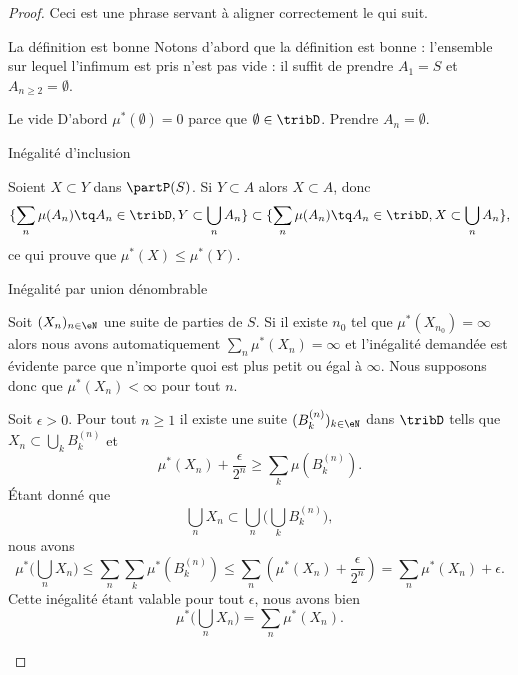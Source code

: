 \begin{proof}
    Ceci est une phrase servant à aligner correctement le  qui suit.
    \begin{subproof}
    \item[La définition est bonne]
    Notons d'abord que la définition est bonne : l'ensemble sur lequel l'infimum est pris n'est pas vide : il suffit de prendre \( A_1=S\) et \( A_{n\geq 2}=\emptyset\).
    \item[Le vide]
        D'abord \( \mu^*(\emptyset)=0\) parce que \( \emptyset\in\tribD\). Prendre \( A_n=\emptyset\).
    \item[Inégalité d'inclusion]

        Soient \( X\subset Y\) dans \( \partP(S)\). Si \( Y\subset A\) alors \( X\subset A\), donc
        \begin{equation}
            \{ \sum_n\mu(A_n)\tq A_n\in\tribD,Y\subset\bigcup_nA_n \} \subset\{ \sum_n\mu(A_n)\tq A_n\in\tribD,X\subset\bigcup_nA_n \} ,
        \end{equation}
        ce qui prouve que \( \mu^*(X)\leq \mu^*(Y)\).
    \item[Inégalité par union dénombrable]

        Soit \( (X_n)_{n\in \eN}\) une suite de parties de \( S\). Si il existe \( n_0\) tel que \( \mu^*(X_{n_0})=\infty\) alors nous avons automatiquement \( \sum_n\mu^*(X_n)=\infty\) et l'inégalité demandée est évidente parce que n'importe quoi est plus petit ou égal à \( \infty\). Nous supposons donc que \( \mu^*(X_n)<\infty\) pour tout \( n\). 

        Soit \( \epsilon>0\). Pour tout \( n\geq 1\) il existe une suite \( (B_k^{(n)})_{k\in \eN}\) dans \( \tribD\) tells que \( X_n\subset\bigcup_kB_k^{(n)}\) et
        \begin{equation}
            \mu^*(X_n)+\frac{ \epsilon }{ 2^n }\geq \sum_k\mu(B_k^{(n)}).
        \end{equation}
        Étant donné que
        \begin{equation}
            \bigcup_nX_n\subset\bigcup_n\big( \bigcup_kB_k^{(n)} \big),
        \end{equation}
        nous avons
        \begin{equation}
            \mu^*\big( \bigcup_nX_n \big)\leq \sum_n\sum_k\mu^*(B_k^{(n)})\leq \sum_n\left( \mu^*(X_n)+\frac{ \epsilon }{ 2^n } \right)=\sum_n\mu^*(X_n)+\epsilon.
        \end{equation}
        Cette inégalité étant valable pour tout \( \epsilon\), nous avons bien
        \begin{equation}
            \mu^*\big( \bigcup_nX_n \big)=\sum_n\mu^*(X_n).
        \end{equation}


\end{subproof}
\end{proof}
